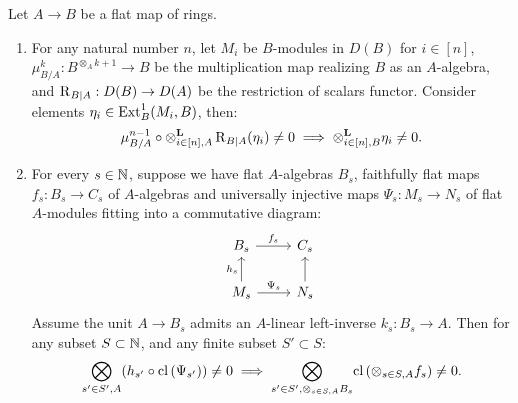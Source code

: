 \begin{proposition}\label{proposition:cup}
Let $A \to B$ be a flat map of rings.
\begin{enumerate}
\item[(i)] For any natural number $n$, let $M_i$ be $B$-modules in $D(B)$ for $i \in [n]$, $\mu_{B/A}^{k}: B^{\otimes_A k+1} \to B$ 
be the multiplication map realizing $B$ as an $A$-algebra, and $\operatorname{R}_{B|A}:D(B) \rightarrow D(A)$ be the restriction of scalars functor. 
Consider elements $\eta_i \in \operatorname{Ext}^1_B(M_i, B)$, then:
\[\mu^{n-1}_{B/A} \circ \otimes^{\boldsymbol{\mathrm{L}}}_{i\in [n],A} \operatorname{R}_{B|A}(\eta_i) \neq 0 \implies \otimes^{\boldsymbol{\mathrm{L}}}_{i\in [n], B} \eta_i \neq 0.\]
\item[(ii)] For every $s \in \mathbb{N}$, suppose we have flat $A$-algebras $B_s$, faithfully flat maps $f_s: B_s \to C_s$ of $A$-algebras 
and universally injective maps $\Psi_s: M_s \to N_s$ of flat $A$-modules fitting into a commutative diagram:
\[\begin{tikzcd}
B_s \arrow[r, "f_s"] & C_s \\
M_s \arrow[u, "h_s"] \arrow[r, "\Psi_s"] & N_s \arrow[u]
\end{tikzcd}\]
Assume the unit $A \to B_s$ admits an $A$-linear left-inverse $k_s: B_s \to A$. Then for any subset $S \subset \mathbb{N}$, and any finite subset $S' \subset S$:
\[\bigotimes_{s' \in S',A} (h_{s'} \circ \mathrm{cl}\left(\Psi_{s'} \right)) \neq 0 \implies \underset{s' \in S', \otimes_{s \in S,A}B_s}{\bigotimes} \mathrm{cl}\left( \otimes_{s \in S,A} f_s\right) \neq 0.\]
\end{enumerate}
\end{proposition}
